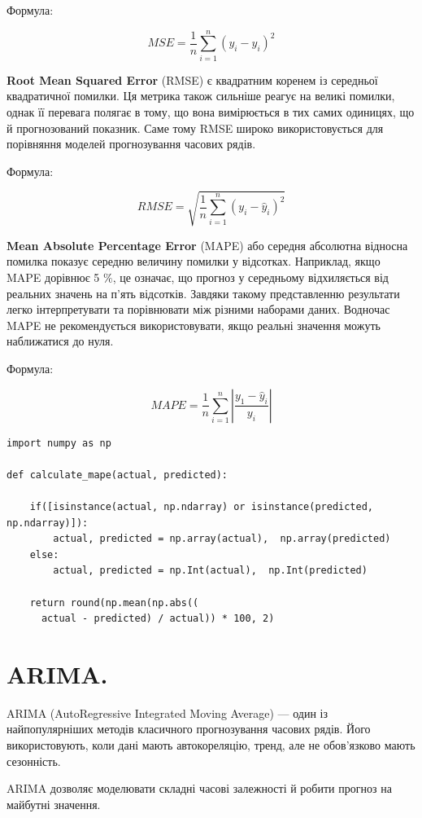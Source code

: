 Формула:

$$MSE = \frac{1}{n}\sum_{i=1}^{n}(y_{i} - \hat{y}_{i})^{2}$$

\textbf{Root Mean Squared Error} (RMSE) є квадратним коренем із середньої квадратичної помилки. Ця метрика також сильніше реагує на великі помилки, однак її перевага полягає в тому, що вона вимірюється в тих самих одиницях, що й прогнозований показник. Саме тому RMSE широко використовується для порівняння моделей прогнозування часових рядів.

Формула:

$$RMSE = \sqrt{\frac{1}{n}\sum_{i=1}^{n}(y_{i} - \hat{y}_{i})^{2}}$$

\textbf{Mean Absolute Percentage Error} (MAPE) або середня абсолютна відносна помилка показує середню величину помилки у відсотках. Наприклад, якщо MAPE дорівнює 5 $\%$, це означає, що прогноз у середньому відхиляється від реальних значень на п'ять відсотків. Завдяки такому представленню результати легко інтерпретувати та порівнювати між різними наборами даних. Водночас MAPE не рекомендується використовувати, якщо реальні значення можуть наближатися до нуля.

Формула:

$$MAPE = \frac{1}{n}\sum_{i=1}^{n}|\frac{y_{1} - \hat{y}_{i}}{y_{i}}|$$

\begin{lstlisting}
import numpy as np

def calculate_mape(actual, predicted): 
  
    if([isinstance(actual, np.ndarray) or isinstance(predicted, np.ndarray)]): 
        actual, predicted = np.array(actual),  np.array(predicted) 
    else:
        actual, predicted = np.Int(actual),  np.Int(predicted)
        
    return round(np.mean(np.abs(( 
      actual - predicted) / actual)) * 100, 2) 
\end{lstlisting}


\section{ARIMA.}

ARIMA (AutoRegressive Integrated Moving Average) — один із найпопулярніших методів класичного прогнозування часових рядів.
Його використовують, коли дані мають автокореляцію, тренд, але не обов’язково мають сезонність.

ARIMA дозволяє моделювати складні часові залежності й робити прогноз на майбутні значення.


